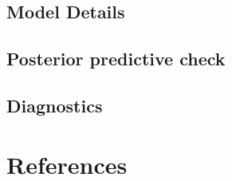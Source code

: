 \documentclass[
  letterpaper,
  DIV=11,
  numbers=noendperiod]{scrartcl}
\begin{document}
\subsection{Model Details}\label{sec-model-details}

\subsection{Posterior predictive
check}\label{posterior-predictive-check}

\subsection{Diagnostics}\label{diagnostics}

\newpage

\section*{References}\label{references}
\end{document}
